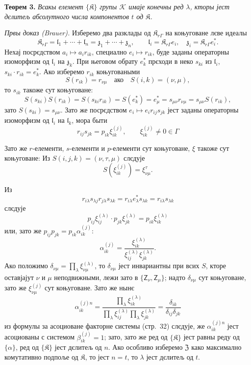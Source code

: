 \documentclass[11pt]{article}
\begin{document}
\textbf{Теорем 3.} \emph{Всакы елемент \(\{\mathfrak K\}\) групы \(\mathscr K\) имаје конечны ред \(\lambda\), кторы јест дєлитељ абсолутного числа компонентов \(t\) од \(\mathfrak K\).}

\emph{Првы доказ (Brauer).} Изберемо два разклады од \(\mathfrak K_{r\Gamma}\) на коњуговане лєве идеалы
\[
\mathfrak K_{r\Gamma}=\mathfrak l_1+\cdots+\mathfrak l_n=\mathfrak z_1+\cdots+\mathfrak z_n,\qquad
\mathfrak l_i=\mathfrak K_{r\Gamma}e_i,\quad
\mathfrak z_i=\mathfrak K_{r\Gamma}e_i^*.
\]
Нехај посрєдством \(a_i\mapsto a_ir_{ik}\), специално \(e_i\mapsto r_{ik}\), буде заданы операторны изоморфизм од \(\mathfrak l_i\) на \(\mathfrak z_k\). При његовом обрату \(e_k^*\) прєходи в неко \(s_{ki}\) из \(\mathfrak l_i\), \(s_{ki}\cdot r_{ik}=e_k^*\). Ако изберемо \(r_{ik}\) коњуговаными
\[
S(r_{ik})=r_{\nu\mu}\quad\text{ако}\quad S(i,k)=(\nu,\mu),
\]
то \(s_{ik}\) такоже сут коњуговане:
\[
S(s_{ki})S(r_{ik})=S(s_{ki}r_{ik})=S(e_k^*)=e_\mu^*
=s_{\mu\nu}r_{\nu\mu}=s_{\mu\nu}S(r_{ik}),
\]
зато \(S(s_{ki})=s_{\mu\nu}\). Зато же посрєдством \(e_i\mapsto e_ir_{ij}s_{jk}\) јест заданы операторны изоморфизм од \(\mathfrak l_i\) на \(\mathfrak l_k\), мора быти
\[
r_{ij}s_{jk}=p_{ik}\xi_{ik}^{(j)},\qquad
\xi_{ik}^{(j)}\ne0\in\Gamma
\]

Зато же \(r\)-елементи, \(s\)-елементи и \(p\)-елементи сут коњуговане, \(\xi\) такоже сут коњуговане: Из \(S(i,j,k)=(\nu,\tau,\mu)\) слєдује
\[
S(\xi_{ik}^{(j)})=\xi_{\nu\mu}^{\tau}.
\]

Из
\[
r_{i\lambda}s_{\lambda j}r_{j\lambda}s_{\lambda k}
=r_{i\lambda}e_\lambda^*s_{\lambda k}
=r_{i\lambda}s_{\lambda k}
\]
слєдује
\[
p_{ij}\xi_{ij}^{(\lambda)}\cdot p_{jk}\xi_{jk}^{(\lambda)}
=p_{ik}\xi_{ik}^{(\lambda)}
\]
или, зато же \(p_{ij}p_{jk}=p_{ik}\alpha_{ik}^{(j)}\):
\[
\alpha_{ik}^{(j)}
=\frac{\xi_{ik}^{(\lambda)}}{\xi_{ij}^{(\lambda)}\xi_{jk}^{(\lambda)}}.
\]
Ако положимо \(\delta_{\nu\mu}=\prod_{\lambda}\xi_{\nu\mu}^{(\lambda)}\), то \(\delta_{\nu\mu}\) јест инвариантны при всих \(S\), кторе оставјајут \(\nu\) и \(\mu\) неподвижными, лежи зато в \(\{\mathsf{Z}_\nu,\mathsf{Z}_\mu\}\); надто \(\delta_{\nu\mu}\) сут коњуговане, зато же \(\xi_{\nu\mu}^{(j)}\) сут коњуговане. Зато же нынє
\[
\alpha_{ik}^{(j)n}
=\frac{\prod_{\lambda}\xi_{ik}^{(\lambda)}}
       {\prod_{\lambda}\xi_{ij}^{(\lambda)}\prod_{\lambda}\xi_{jk}^{(\lambda)}}
=\frac{\delta_{ik}}{\delta_{ij}\delta_{jk}}
\]
из формулы за асоциоване факторне системы (стр.~32) слєдује, же \(\alpha_{ik}^{(j)n}\) јест асоциованы с системом \(\beta_{ik}^{(j)}=1\); зато, зато же ред од \(\{\mathfrak K\}\) јест равны реду од \(\{\alpha\}\), ред од \(\{\mathfrak K\}\) јест дєлитељ од \(n\). Ако особливо изберемо \(\mathfrak Z\) како максимално комутативно подпоље од \(\mathfrak K\), то јест \(n=t\), то \(\lambda\) јест дєлитељ од \(t\).
\end{document}
